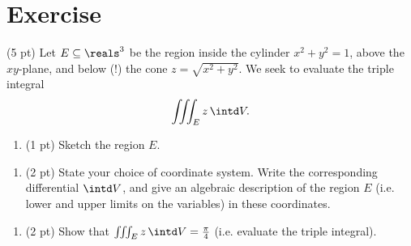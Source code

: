 \section{Exercise}

(5 pt) Let $E \subseteq \reals^{3}$ be the region inside the cylinder $x^{2} + y^{2} = 1$, above the $x y$-plane, and below (!) the cone $z = \sqrt{x^{2} + y^{2}}$. We seek to evaluate the triple integral
\begin{align*}
\iiint_{E} z \, \intd V.
\end{align*}
\begin{enumerate}[label=(\alph*)]
\item (1 pt) Sketch the region $E$. 
\end{enumerate}





\begin{enumerate}[label=(\alph*)]
\item (2 pt) State your choice of coordinate system. Write the corresponding differential $\intd V$, and give an algebraic description of the region $E$ (i.e. lower and upper limits on the variables) in these coordinates. 
\end{enumerate}




\begin{enumerate}[resume,label=(\alph*)]
\item (2 pt) Show that $\iiint_{E} z \, \intd V = \frac{\pi}{4}$ (i.e. evaluate the triple integral).
\end{enumerate}

